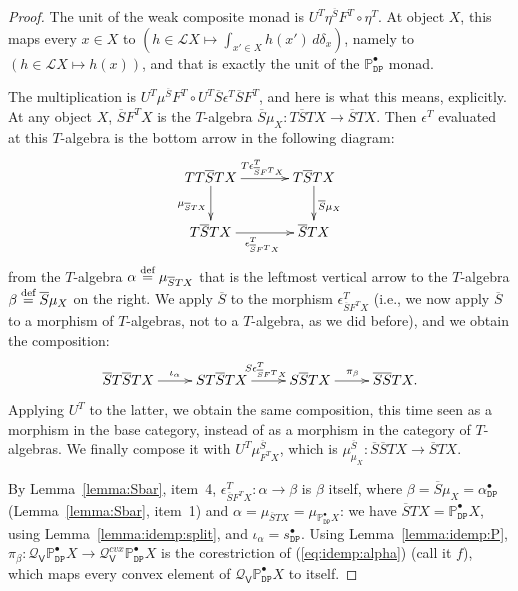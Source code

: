 \documentclass[preprint,12pt]{elsarticle}
\newcommand\eqdef{\mathrel{\buildrel \text{def}\over=}}
\newcommand\Lform{\mathcal L}
\newcommand\Pred{\mathbb{P}}
\newcommand\Demon{{\mathtt{D}}}
\newcommand\Nature{{\mathtt{P}}}
\newcommand\DN{{\Demon\Nature}}
\newcommand\Smyth{{\mathcal Q}}
\newcommand\Vt{\mathsf{V}}
\newcommand\SV{\Smyth_{\Vt}}
\begin{document}
\begin{proof}
  The unit of the weak composite monad is
  $U^T \eta^{\overline S} F^T \circ \eta^T$.  At object $X$, this maps
  every $x \in X$ to
  $(h \in \Lform X \mapsto \int_{x' \in X} h (x') \,d\delta_x)$,
  namely to $(h \in \Lform X \mapsto h (x))$, and that is exactly the
  unit of the $\Pred_\DN^\bullet$ monad.

  The multiplication is
  $U^T \mu^{\overline S} F^T \circ U^T \overline S \epsilon^T
  \overline S F^T$, and here is what this means, explicitly.  At any
  object $X$, $\overline S F^T X$ is the $T$-algebra
  $\overline S\mu_X \colon T \overline S T X \to \overline S T X$.
  Then $\epsilon^T$ evaluated at this $T$-algebra is the bottom arrow
  in the following diagram:
  \[
    \xymatrix@C+10pt{
      TT\overline S T X
      \ar[d]_{\mu_{\overline S T X}}
      \ar[r]^{T \epsilon^T_{\overline S F^T X}}
      & T \overline S T X
      \ar[d]^{\overline S \mu_X}
      \\
      T \overline S T X
      \ar[r]_{\epsilon^T_{\overline S F^T X}}
      & \overline S T X
    }
  \]
  from the $T$-algebra $\alpha \eqdef \mu_{\overline S T X}$ that is
  the leftmost vertical arrow to the $T$-algebra
  $\beta \eqdef \overline S \mu_X$ on the right.  We apply $\overline
  S$ to the morphism $\epsilon^T_{\overline S F^T X}$ (i.e., we now
  apply $\overline S$ to a morphism of $T$-algebras, not to a
  $T$-algebra, as we did before), and we obtain the composition:
  \begin{equation}
    \label{eq:mu:part}
    \xymatrix{
      \overline S T \overline S T X
      \ar[r]^{\iota_\alpha}
      &
      S T \overline S T X
      \ar[r]^{S \epsilon^T_{\overline S F^T X}}
      &
      S \overline S T X
      \ar[r]^{\pi_\beta}
      &
      \overline S \overline S T X.
    }
  \end{equation}
  Applying $U^T$ to the latter, we obtain the same composition, this
  time seen as a morphism in the base category, instead of as a
  morphism in the category of $T$-algebras.  We finally compose it
  with $U^T \mu^{\overline S}_{F^T X}$, which is
  $\mu^{\overline S}_{\mu_X} \colon \overline S \overline S T X \to
  \overline S T X$.

  By Lemma~\ref{lemma:Sbar}, item~4,
  $\epsilon^T_{\overline S F^T X} \colon \alpha \to \beta$ is $\beta$
  itself, where $\beta = \overline S \mu_X = \alpha_\DN^\bullet$
  (Lemma~\ref{lemma:Sbar}, item~1) and
  $\alpha = \mu_{\overline S T X} = \mu_{\Pred_\DN^\bullet X}$: we
  have $\overline S T X = \Pred_\DN^\bullet X$, using
  Lemma~\ref{lemma:idemp:split}, and $\iota_\alpha = s_\DN^\bullet$.
  Using Lemma~\ref{lemma:idemp:P},
  $\pi_\beta \colon \SV {\Pred_\DN^\bullet X} \to \SV^{cvx}
  {\Pred_\DN^\bullet X}$ is the corestriction of
  (\ref{eq:idemp:alpha}) (call it $f$), which maps every convex
  element of $\SV {\Pred_\DN^\bullet X}$ to itself.


\end{proof}
\end{document}
